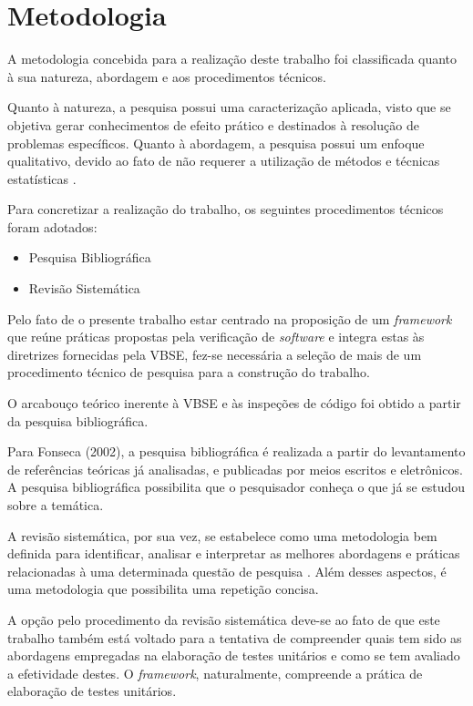 \chapter{Metodologia}

A metodologia concebida para a realização deste trabalho foi classificada quanto à sua natureza, abordagem e aos procedimentos técnicos.

Quanto à natureza, a pesquisa possui uma caracterização aplicada, visto que se objetiva gerar conhecimentos de efeito prático e destinados à resolução de problemas específicos. Quanto à abordagem, a pesquisa possui um enfoque qualitativo, devido ao fato de não requerer a utilização de métodos e técnicas estatísticas \cite{metodologia}.

Para concretizar a realização do trabalho, os seguintes procedimentos técnicos foram adotados:

\begin{itemize}
	\item Pesquisa Bibliográfica
	\item Revisão Sistemática
\end{itemize}

Pelo fato de o presente trabalho estar centrado na proposição de um \textit{framework} que reúne práticas propostas pela verificação de \textit{software} e integra estas às diretrizes fornecidas pela VBSE, fez-se necessária a seleção de mais de um procedimento técnico de pesquisa para a construção do trabalho.
 
O arcabouço teórico inerente à VBSE e às inspeções de código foi obtido a partir da pesquisa bibliográfica.

Para Fonseca (2002), a pesquisa bibliográfica é realizada a partir do levantamento de referências teóricas já analisadas, e publicadas por meios escritos e eletrônicos. A pesquisa bibliográfica possibilita que o pesquisador conheça o que já se estudou sobre a temática.

A revisão sistemática, por sua vez, se estabelece como uma metodologia bem definida para identificar, analisar e interpretar as melhores abordagens e práticas relacionadas à uma determinada questão de pesquisa \cite{sistematica}. Além desses aspectos, é uma metodologia que possibilita uma repetição concisa.

A opção pelo procedimento da revisão sistemática deve-se ao fato de que este trabalho também está voltado para a tentativa de compreender quais tem sido as abordagens empregadas na elaboração de testes unitários e como se tem avaliado a efetividade destes. O \textit{framework}, naturalmente, compreende a prática de elaboração de testes unitários.

